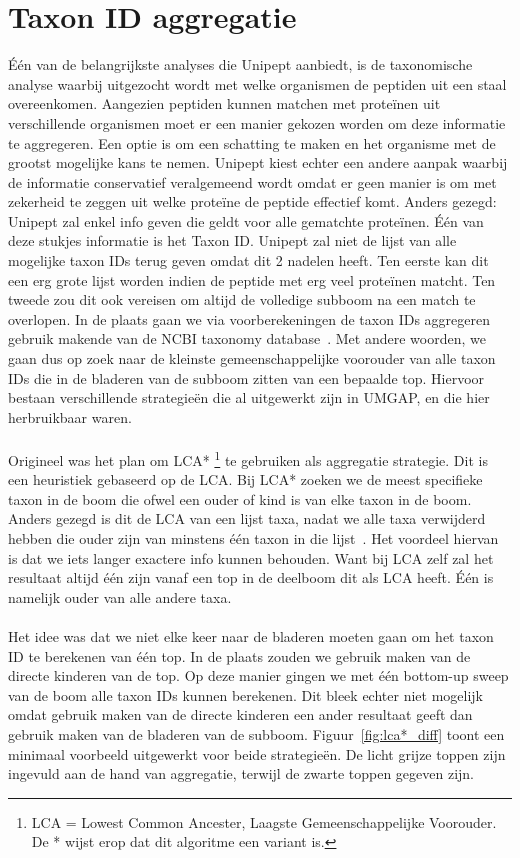 \section{Taxon ID aggregatie}\label{sec:taxon-id-aggregatie}
Één van de belangrijkste analyses die Unipept aanbiedt, is de taxonomische analyse waarbij uitgezocht wordt met welke organismen de peptiden uit een staal overeenkomen.
Aangezien peptiden kunnen matchen met proteïnen uit verschillende organismen moet er een manier gekozen worden om deze informatie te aggregeren.
Een optie is om een schatting te maken en het organisme met de grootst mogelijke kans te nemen.
Unipept kiest echter een andere aanpak waarbij de informatie conservatief veralgemeend wordt omdat er geen manier is om met zekerheid te zeggen uit welke proteïne de peptide effectief komt.
Anders gezegd: Unipept zal enkel info geven die geldt voor alle gematchte proteïnen.
Één van deze stukjes informatie is het Taxon ID\@.
Unipept zal niet de lijst van alle mogelijke taxon IDs terug geven omdat dit 2 nadelen heeft.
Ten eerste kan dit een erg grote lijst worden indien de peptide met erg veel proteïnen matcht.
Ten tweede zou dit ook vereisen om altijd de volledige subboom na een match te overlopen.
In de plaats gaan we via voorberekeningen de taxon IDs aggregeren gebruik makende van de NCBI taxonomy database~\cite{NCBI_original_article, NCBI_update}.
Met andere woorden, we gaan dus op zoek naar de kleinste gemeenschappelijke voorouder van alle taxon IDs die in de bladeren van de subboom zitten van een bepaalde top.
Hiervoor bestaan verschillende strategieën die al uitgewerkt zijn in UMGAP, en die hier herbruikbaar waren.
\\ \\
Origineel was het plan om LCA* \footnote{LCA = Lowest Common Ancester, Laagste Gemeenschappelijke Voorouder. De * wijst erop dat dit algoritme een variant is.} te gebruiken als aggregatie strategie.
Dit is een heuristiek gebaseerd op de LCA.
Bij LCA* zoeken we de meest specifieke taxon in de boom die ofwel een ouder of kind is van elke taxon in de boom.
Anders gezegd is dit de LCA van een lijst taxa, nadat we alle taxa verwijderd hebben die ouder zijn van minstens één taxon in die lijst~\cite{UMGAP_paper}.
Het voordeel hiervan is dat we iets langer exactere info kunnen behouden.
Want bij LCA zelf zal het resultaat altijd één zijn vanaf een top in de deelboom dit als LCA heeft.
Één is namelijk ouder van alle andere taxa.
\\ \\
Het idee was dat we niet elke keer naar de bladeren moeten gaan om het taxon ID te berekenen van één top.
In de plaats zouden we gebruik maken van de directe kinderen van de top.
Op deze manier gingen we met één bottom-up sweep van de boom alle taxon IDs kunnen berekenen.
Dit bleek echter niet mogelijk omdat gebruik maken van de directe kinderen een ander resultaat geeft dan gebruik maken van de bladeren van de subboom.
Figuur~\ref{fig:lca*_diff} toont een minimaal voorbeeld uitgewerkt voor beide strategieën.
De licht grijze toppen zijn ingevuld aan de hand van aggregatie, terwijl de zwarte toppen gegeven zijn.

